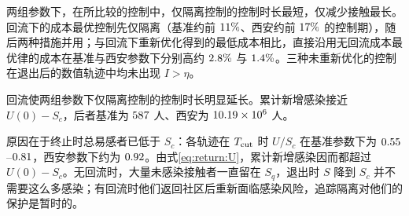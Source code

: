 两组参数下，在所比较的控制中，仅隔离控制的控制时长最短，仅减少接触最长。回流下的成本最优控制先仅隔离（基准约前 $11\%$、西安约前 $17\%$ 的控制期），随后两种措施并用；与回流下重新优化得到的最低成本相比，直接沿用无回流成本最优律的成本在基准与西安参数下分别高约 $2.8\%$ 与 $1.4\%$。三种未重新优化的控制在退出后的数值轨迹中均未出现 $I>\eta$。

回流使两组参数下仅隔离控制的控制时长明显延长。累计新增感染接近 $U(0)-S_c$，后者基准为 $587$ 人、西安为 $10.19\times10^6$ 人。

原因在于终止时总易感者已低于 $S_c$：各轨迹在 $T_{\rm cut}$ 时 $U/S_c$ 在基准参数下为 $0.55$--$0.81$，西安参数下约为 $0.92$。由式\eqref{eq:return:U}，累计新增感染因而都超过 $U(0)-S_c$。无回流时，大量未感染接触者一直留在 $S_q$，退出时 $S$ 降到 $S_c$ 并不需要这么多感染；有回流时他们返回社区后重新面临感染风险，追踪隔离对他们的保护是暂时的。
